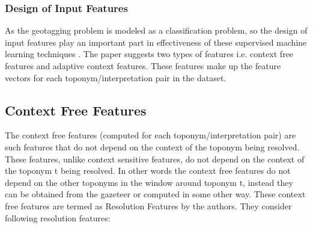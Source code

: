 \documentclass[
     11pt,         %
     a4paper,      %
     oneside,
     ]{article}
\begin{document}
\subsubsection{Design of Input Features}
As the geotagging problem is modeled as a classification problem, so the design of input features play an important part in effectiveness of these supervised machine learning techniques \cite{Lieberman12adaptivecontext}. The paper suggests two types of features i.e. context free features and adaptive context features. These features make up the feature vectors for each toponym/interpretation pair in the dataset.

\subsection{Context Free Features}
The context free features (computed for each toponym/interpretation pair) are such features that do not depend on the context of the toponym being resolved. These features, unlike context sensitive features, do not depend on the context of the toponym t being resolved. In other words the context free features do not depend on the other toponyms in the window around toponym t, instead they can be obtained from the gazeteer or computed in some other way. These context free features are termed as Resolution Features by the authors. They consider following resolution features:
\end{document}
